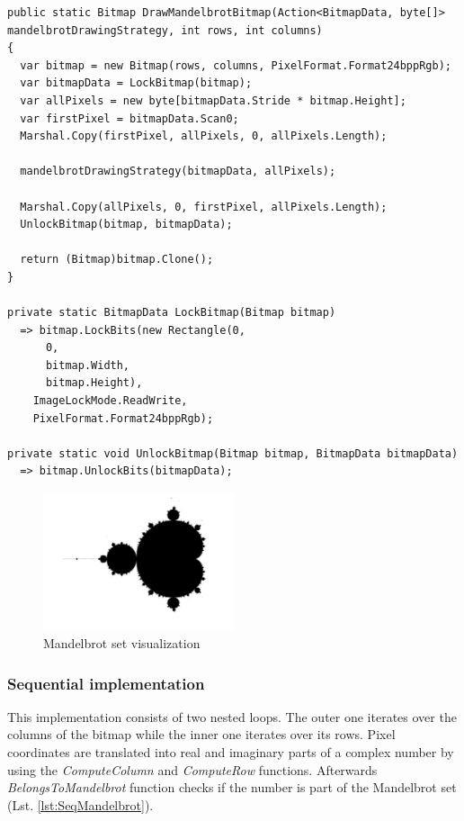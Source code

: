 \begin{lstlisting}[style=sharpcstyle, caption={Mandelbrot bitmap generation}, label={lst:Bitmap}]
public static Bitmap DrawMandelbrotBitmap(Action<BitmapData, byte[]> mandelbrotDrawingStrategy, int rows, int columns)
{
  var bitmap = new Bitmap(rows, columns, PixelFormat.Format24bppRgb);
  var bitmapData = LockBitmap(bitmap);
  var allPixels = new byte[bitmapData.Stride * bitmap.Height];
  var firstPixel = bitmapData.Scan0;
  Marshal.Copy(firstPixel, allPixels, 0, allPixels.Length);

  mandelbrotDrawingStrategy(bitmapData, allPixels);

  Marshal.Copy(allPixels, 0, firstPixel, allPixels.Length);
  UnlockBitmap(bitmap, bitmapData);

  return (Bitmap)bitmap.Clone();
}

private static BitmapData LockBitmap(Bitmap bitmap) 
  => bitmap.LockBits(new Rectangle(0,
      0,
      bitmap.Width,
      bitmap.Height),
    ImageLockMode.ReadWrite,
    PixelFormat.Format24bppRgb);

private static void UnlockBitmap(Bitmap bitmap, BitmapData bitmapData) 
  => bitmap.UnlockBits(bitmapData);

\end{lstlisting}

\begin{figure}[!ht]
	\centering
		\includegraphics[width = 0.5\textwidth]{figures04/MandelbrotVis.png}
	\caption{Mandelbrot set visualization}
	\label{fig:MandelbrotVis}
\end{figure}

\pagebreak
\subsubsection{Sequential implementation}
This implementation consists of two nested loops. The outer one iterates over the columns of the bitmap while the inner one iterates over its rows. 
Pixel coordinates are translated into real and imaginary parts of a complex number by using the \emph{ComputeColumn} and \emph{ComputeRow} functions. Afterwards \emph{BelongsToMandelbrot} function checks if the number is part of the Mandelbrot set (Lst. \ref{lst:SeqMandelbrot}).

